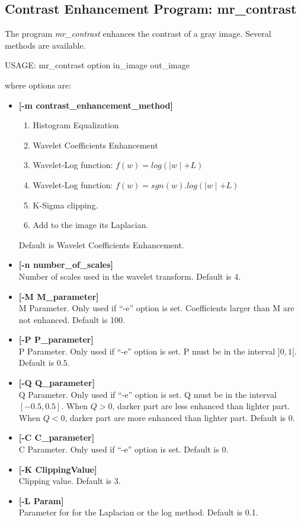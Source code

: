 \subsection{Contrast Enhancement Program: mr\_contrast}
The program {\em mr\_contrast} enhances the contrast of a gray image. 
Several methods are available. 
{\bf
\begin{center}
 USAGE: mr\_contrast option in\_image out\_image
\end{center}}
where options are:
\begin{itemize}
\baselineskip=0.4truecm
\itemsep=0.1truecm
\item {\bf [-m contrast\_enhancement\_method]} 
\begin{enumerate}
\baselineskip=0.4truecm
\itemsep=0.1truecm
\item Histogram Equalization 
\item Wavelet Coefficients Enhancement 
\item Wavelet-Log function: $f(w) = log(\mid w \mid +L) $
\item Wavelet-Log function: $f(w) = sgn(w).log(\mid w \mid+L)$ 
\item K-Sigma clipping.
\item Add to the image its Laplacian. 
\end{enumerate}
Default is Wavelet Coefficients Enhancement.
\item {\bf [-n number\_of\_scales]} \\
Number of scales used in the wavelet transform.
Default is 4. 
\item {\bf [-M M\_parameter]} \\
M Parameter. Only used if ``-e'' option is set. 
Coefficients larger than M are not enhanced. 
Default is 100.
\item {\bf [-P P\_parameter]} \\
P Parameter. Only used if ``-e'' option is set. 
P must be in the interval $]0,1[$.
Default is $0.5$.
\item {\bf [-Q Q\_parameter]} \\ 
Q Parameter. Only used if ``-e'' option is set. 
Q must be in the interval $[-0.5,0.5]$. When $Q > 0$,
darker part are less enhanced than lighter part.
When $Q < 0$, darker part are more enhanced than lighter part.
Default is $0$.
\item {\bf [-C C\_parameter]} \\  
C Parameter. Only used if ``-e'' option is set. 
Default is $0$.
\item {\bf [-K ClippingValue]} \\
Clipping value. Default is 3.
\item {\bf [-L Param]} \\
Parameter for for the Laplacian or the log method. Default is 0.1.
\end{itemize}
